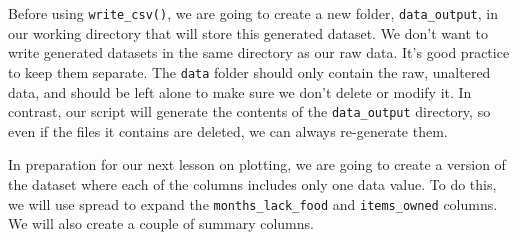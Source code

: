\documentclass[]{book}
\newenvironment{Shaded}{\begin{snugshade}}{\end{snugshade}}
\newcommand{\KeywordTok}[1]{\textcolor[rgb]{0.13,0.29,0.53}{\textbf{#1}}}
\newcommand{\DataTypeTok}[1]{\textcolor[rgb]{0.13,0.29,0.53}{#1}}
\newcommand{\StringTok}[1]{\textcolor[rgb]{0.31,0.60,0.02}{#1}}
\newcommand{\OtherTok}[1]{\textcolor[rgb]{0.56,0.35,0.01}{#1}}
\newcommand{\OperatorTok}[1]{\textcolor[rgb]{0.81,0.36,0.00}{\textbf{#1}}}
\newcommand{\NormalTok}[1]{#1}
\begin{document}
Before using \texttt{write\_csv()}, we are going to create a new folder,
\texttt{data\_output}, in our working directory that will store this
generated dataset. We don't want to write generated datasets in the same
directory as our raw data. It's good practice to keep them separate. The
\texttt{data} folder should only contain the raw, unaltered data, and
should be left alone to make sure we don't delete or modify it. In
contrast, our script will generate the contents of the
\texttt{data\_output} directory, so even if the files it contains are
deleted, we can always re-generate them.

In preparation for our next lesson on plotting, we are going to create a
version of the dataset where each of the columns includes only one data
value. To do this, we will use spread to expand the
\texttt{months\_lack\_food} and \texttt{items\_owned} columns. We will
also create a couple of summary columns.

\begin{Shaded}
\end{Shaded}
\end{document}
